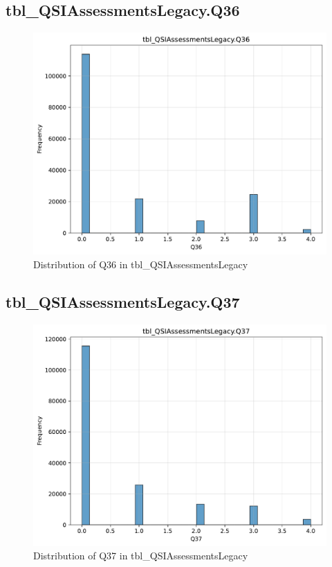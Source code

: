 \subsection{tbl\_QSIAssessmentsLegacy.Q36}

\begin{figure}[htbp]
\centering
\includegraphics[width=\textwidth]{figures/dbo_tbl_QSIAssessmentsLegacy_Q36.pdf}
\caption{Distribution of Q36 in tbl\_QSIAssessmentsLegacy}
\end{figure}\newpage

\subsection{tbl\_QSIAssessmentsLegacy.Q37}

\begin{figure}[htbp]
\centering
\includegraphics[width=\textwidth]{figures/dbo_tbl_QSIAssessmentsLegacy_Q37.pdf}
\caption{Distribution of Q37 in tbl\_QSIAssessmentsLegacy}
\end{figure}\newpage

